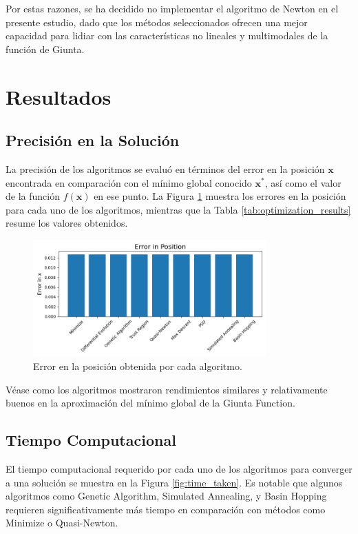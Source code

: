 \documentclass[fontsize=10pt]{article}
\begin{document}
Por estas razones, se ha decidido no implementar el algoritmo de Newton en el presente estudio, dado que los métodos seleccionados ofrecen una mejor capacidad para lidiar con las características no lineales y multimodales de la función de Giunta.




\section{Resultados}
\subsection{Precisión en la Solución}

La precisión de los algoritmos se evaluó en términos 
del error en la posición \( \mathbf{x} \) encontrada 
en comparación con el mínimo global conocido 
\( \mathbf{x}^* \), así como el valor de la función 
\( f(\mathbf{x}) \) en ese punto. La Figura 
\ref{fig:error_in_position} muestra los errores en 
la posición para cada uno de los algoritmos, mientras 
que la Tabla \ref{tab:optimization_results} resume los 
valores obtenidos.

\begin{figure}[h!]
    \centering
    \includegraphics[width=0.8\textwidth]{images/error_in_position.png}
    \caption{Error en la posición obtenida por cada algoritmo.}
    \label{fig:error_in_position}
\end{figure}

Véase como los algoritmos mostraron rendimientos similares
y relativamente buenos en la aproximación del mínimo global de la Giunta Function.

\subsection{Tiempo Computacional}

El tiempo computacional requerido por cada uno de los 
algoritmos para converger a una solución se muestra en 
la Figura \ref{fig:time_taken}. Es notable que algunos 
algoritmos como Genetic Algorithm, Simulated Annealing, 
y Basin Hopping requieren significativamente más 
tiempo en comparación con métodos como Minimize o 
Quasi-Newton.
\end{document}
